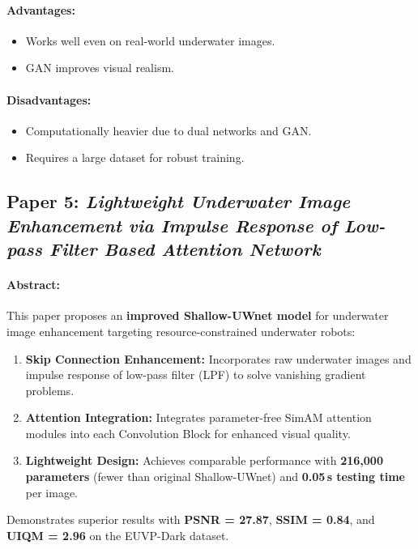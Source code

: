 \documentclass{article}
\begin{document}
\paragraph{Advantages:}
\begin{itemize}
    \item Works well even on real-world underwater images.
    \item GAN improves visual realism.

\end{itemize}

\paragraph{Disadvantages:}
\begin{itemize}
    \item Computationally heavier due to dual networks and GAN.
    \item Requires a large dataset for robust training.
\end{itemize}

\subsection{Paper 5: \textit{Lightweight Underwater Image Enhancement via Impulse Response of Low-pass Filter Based Attention Network}}

\paragraph{Abstract:}  
This paper proposes an \textbf{improved Shallow-UWnet model} for underwater image enhancement targeting resource-constrained underwater robots:
\begin{enumerate}
    \item \textbf{Skip Connection Enhancement:} Incorporates raw underwater images and impulse response of low-pass filter (LPF) to solve vanishing gradient problems.
    \item \textbf{Attention Integration:} Integrates parameter-free SimAM attention modules into each Convolution Block for enhanced visual quality.
    \item \textbf{Lightweight Design:} Achieves comparable performance with \textbf{216,000 parameters} (fewer than original Shallow-UWnet) and \textbf{0.05\,s testing time} per image.
\end{enumerate}
Demonstrates superior results with \textbf{PSNR = 27.87}, \textbf{SSIM = 0.84}, and \textbf{UIQM = 2.96} on the EUVP-Dark dataset.
\end{document}
